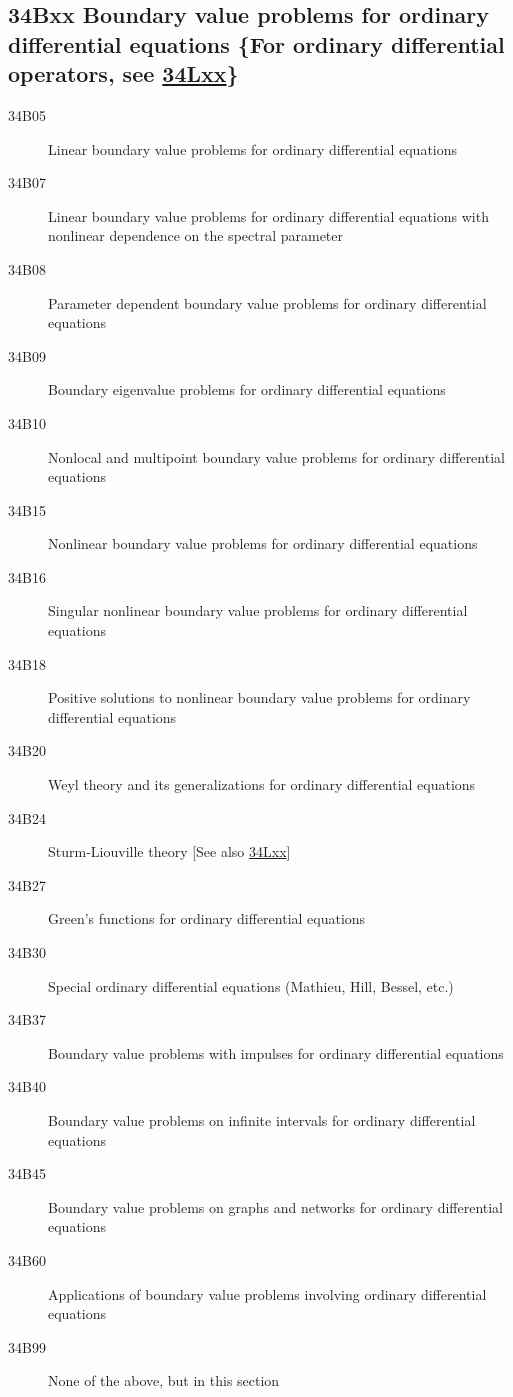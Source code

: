 \subsection*{34Bxx  Boundary value problems for ordinary differential equations \{For ordinary differential operators, see \hyperref[34Lxx]{34Lxx}\} }\label{34Bxx}
\begin{description}  
\item [34B05]\label{34B05} Linear boundary value problems for ordinary differential equations
\item [34B07]\label{34B07} Linear boundary value problems for ordinary differential equations with nonlinear dependence on the spectral parameter
\item [34B08]\label{34B08} Parameter dependent boundary value problems for ordinary differential equations
\item [34B09]\label{34B09} Boundary eigenvalue problems for ordinary differential equations
\item [34B10]\label{34B10} Nonlocal and multipoint boundary value problems for ordinary differential equations
\item [34B15]\label{34B15} Nonlinear boundary value problems for ordinary differential equations
\item [34B16]\label{34B16} Singular nonlinear boundary value problems for ordinary differential equations
\item [34B18]\label{34B18} Positive solutions to nonlinear boundary value problems for ordinary differential equations
\item [34B20]\label{34B20} Weyl theory and its generalizations for ordinary differential equations
\item [34B24]\label{34B24} Sturm-Liouville theory [See also \hyperref[34Lxx]{34Lxx}]
\item [34B27]\label{34B27} Green's functions for ordinary differential equations
\item [34B30]\label{34B30} Special ordinary differential equations (Mathieu, Hill, Bessel, etc.)
\item [34B37]\label{34B37} Boundary value problems with impulses for ordinary differential equations
\item [34B40]\label{34B40} Boundary value problems on infinite intervals for ordinary differential equations
\item [34B45]\label{34B45} Boundary value problems on graphs and networks for ordinary differential equations
\item [34B60]\label{34B60} Applications of boundary value problems involving ordinary differential equations 
\item [34B99]\label{34B99} None of the above, but in this section
\end{description}
